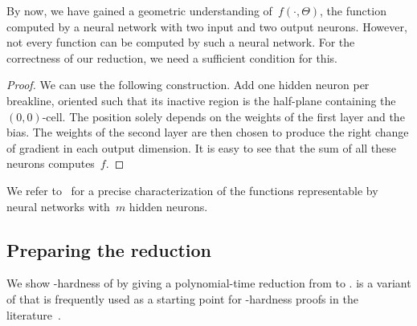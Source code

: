 \documentclass{toc}
\begin{document}
By now, we
have  %
gained a geometric understanding of~$f(\cdot, \Theta)$, the \CPWL function
computed by a \ReLU neural network with two input and two output neurons.
However, not every \CPWL function can be computed by such a neural network.
For the correctness of our reduction, we need a sufficient condition for
this. %


\begin{proof}
    We can use the following construction. %
%
%
    Add one hidden neuron per breakline, oriented such that its inactive region is the half-plane containing the $(0,0)$-cell.
    The position solely depends on the weights of the first layer and the bias.
    The weights of the second layer are then chosen to produce the right change of gradient in each output dimension.
    It is easy to see that the sum of all these neurons computes~$f$.
\end{proof}

We refer to~\cite{Dereich2022_Minimal} for a precise characterization of the functions representable by \twolayer neural networks with~$m$ hidden neurons.

\subsection{Preparing the reduction}
\label{sec:reduction_overview}

We show \ER-hardness of \trainNN by giving a polynomial-time reduction from \ETRINV to \trainNN.
\ETRINV is a variant of \ETR that is frequently used as a starting point for \ER-hardness proofs in the literature~\cite{Abrahamsen2022_ArtGallery, Abrahamsen2021_NeuralNetworks, Dobbins2023_AreaUniversality, Lubiw2022_DrawingInPolygonialRegion}.
\end{document}
